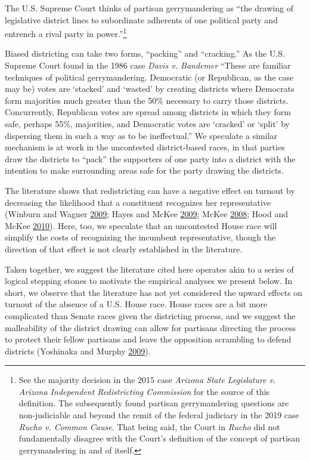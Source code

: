 \documentclass[
  12pt,
]{article}
\begin{document}
The U.S. Supreme Court thinks of partisan gerrymandering as ``the drawing of legislative district lines to subordinate adherents of one political party and entrench a rival party in power.''\footnote{See the majority decision in the 2015 case \emph{Arizona State Legislature v. Arizona Independent Redistricting Commission} for the source of this definition. The subsequently found partisan gerrymandering questions are non-judiciable and beyond the remit of the federal judiciary in the 2019 case \emph{Rucho v. Common Cause}. That being said, the Court in \emph{Rucho} did not fundamentally disagree with the Court's definition of the concept of partisan gerrymandering in and of itself.}

Biased districting can take two forms, ``packing'' and ``cracking.'' As the U.S. Supreme Court found in the 1986 case \emph{Davis v. Bandemer} ``These are familiar techniques of political gerrymandering. Democratic (or Republican, as the case may be) votes are `stacked' and `wasted' by creating districts where Democrats form majorities much greater than the 50\% necessary to carry those districts. Concurrently, Republican votes are spread among districts in which they form safe, perhaps 55\%, majorities, and Democratic votes are `cracked' or `split' by dispersing them in such a way as to be ineffectual.'' We speculate a similar mechanism is at work in the uncontested district-based races, in that parties draw the districts to ``pack'' the supporters of one party into a district with the intention to make surrounding areas safe for the party drawing the districts.

The literature shows that redistricting can have a negative effect on turnout by decreasing the likelihood that a constituent recognizes her representative (Winburn and Wagner \protect\hyperlink{ref-Winburn2009}{2009}; Hayes and McKee \protect\hyperlink{ref-Hayes2009}{2009}; McKee \protect\hyperlink{ref-McKee2008}{2008}; Hood and McKee \protect\hyperlink{ref-Hood2010}{2010}). Here, too, we speculate that an uncontested House race will simplify the costs of recognizing the incumbent representative, though the direction of that effect is not clearly established in the literature.

Taken together, we suggest the literature cited here operates akin to a series of logical stepping stones to motivate the empirical analyses we present below. In short, we observe that the literature has not yet considered the upward effects on turnout of the absence of a U.S. House race. House races are a bit more complicated than Senate races given the districting process, and we suggest the malleability of the district drawing can allow for partisans directing the process to protect their fellow partisans and leave the opposition scrambling to defend districts (Yoshinaka and Murphy \protect\hyperlink{ref-Yoshinaka2009}{2009}).
\end{document}

